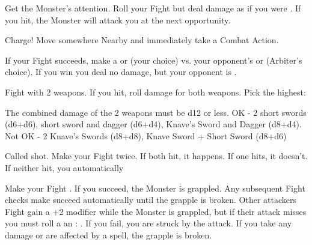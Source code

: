 {  

  Get the Monster's attention.  Roll your Fight \RO but deal damage as if you were .   If you hit, the Monster will attack you at the next opportunity.


  Charge!  Move somewhere Nearby and immediately take a Combat Action.


  If your Fight \RO succeeds, make a \RB \VIG or \RB \DEX (your choice) vs. your opponent's \VIG or \DEX (Arbiter's choice). If you win you deal no damage, but your opponent is .


  Fight with 2 weapons.  If you hit, roll damage for both weapons.  Pick the highest:

  The combined damage of the 2 weapons must be d12 or less.  OK - 2 short swords (d6+d6), short sword and dagger (d6+d4), Knave's Sword and Dagger (d8+d4).  Not OK - 2 Knave's Swords (d8+d8), Knave Sword + Short Sword (d8+d6)


  Called shot.  Make your Fight \RO twice.  If both hit, it happens.  If one hits, it doesn't.  If neither hit, you automatically 



  Make your Fight \RO.  If you succeed, the Monster is grappled.  Any subsequent Fight checks  make succeed automatically until the grapple is broken.  Other attackers Fight \RO gain a +2 modifier while the Monster is grappled, but if their attack misses you must roll a an \RS : \DEX.  If you fail, you are struck by the attack.  If you take any damage or are affected by a spell, the grapple is broken.

}
